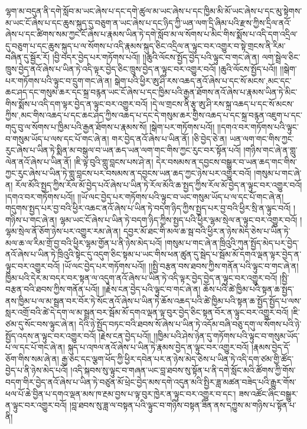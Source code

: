 ལྷག་མ་བདུན་ནི་དགེ་སློབ་མ་ཡང་ཞེས་པ་དང་དགེ་ཚུལ་མ་ཡང་ཞེས་པ་དང་ཁྱིམ་མི་མོ་ཡང་ཞེས་པ་དང་མུ་སྟེགས་མ་ཡང་ངོ་ཞེས་པ་དང་ཆུས་སྐུད་དུ་བཅུག་ན་ཡང་ཞེས་པ་དང་ཉིད་ཀྱི་ཡན་ལག་དྲི་ཞིམ་པའི་རྫས་ཀྱིས་དྲིལ་ནའོ་ཞེས་པ་དང་ཚིགས་སམ་ཀྱང་ངོ་ཞེས་པ་རྣམས་ཡིན་ཏེ་དགེ་སློབ་མ་ལ་སོགས་པ་མིང་གིས་སྨོས་པ་འདི་དག་འདྲིལ་དུ་བཅུག་པ་དང་ཆུས་སྐུད་པ་ལ་སོགས་པ་འདི་རྣམས་སྐུད་ཅིང་འདྲིལ་ན་ལྟུང་བར་འགྱུར་བ་སྟེ་གྲངས་ནི་རིམ་བཞིན་དུ་སྦྱོར་རོ། །བྱི་བདར་བྱེད་པར་གཏོགས་པའོ།། །།ཆུའི་ལོངས་སྤྱོད་བྱེད་པའི་ལྟུང་བ་གང་ཞེ་ན། ལག་སྦྲེལ་ཅིང་ཁྲུས་བྱེད་ནའོ་ཞེས་པ་ཡིན་ཏེ་འདི་ལྟར་བྱེད་ཅིང་ཁྲུས་བྱེད་ན་ལྟུང་བར་འགྱུར་བའོ། །ཆུའི་ལོངས་སྤྱོད་པའོ།། །།སྒེག་པར་གཏོགས་པའི་ལྟུང་བ་དྲུག་གང་ཞེ་ན། སྒེག་པའི་ཕྱིར་ཨུ་ཤི་རས་འཆད་ནའོ་ཞེས་པ་དང་སོ་{མངས་,མང་}དང་ཆང་ཤད་དང་གསུམ་ཆར་དང་སྐྲ་བརྙན་ཡང་ངོ་ཞེས་པ་དང་ཁྱིམ་པའི་རྒྱན་ཐོགས་ནའོ་ཞེས་པ་རྣམས་ཡིན་ཏེ་མིང་གིས་སྨོས་པ་འདི་དག་ལྟར་བྱེད་ན་ལྟུང་བར་འགྱུར་བའོ། །དེ་ལ་གྲངས་ནི་རྩྭ་ཨུ་ཤི་རས་སྐྲ་འཆད་པ་དང་སོ་{མངས་ཀྱིས་,མང་གིས་}འཆད་པ་དང་ཆང་ཤད་ཀྱིས་འཆད་པ་དང་དེ་གསུམ་ཆར་གྱིས་འཆད་པ་དང་སྐྲ་བརྙན་འཇུག་པ་དང་གདུ་བུ་ལ་སོགས་པ་ཁྱིམ་པའི་རྒྱན་ཐོགས་པ་རྣམས་སོ། །སྒེག་པར་གཏོགས་པའོ།། །།དགའ་བར་གཏོགས་པའི་ལྟུང་བ་གསུམ་ཡོད་པ་ལས་དང་པོ་གང་ཞེ་ན། གར་བྱེད་ནའོ་ཞེས་པ་ཡིན་ནོ། །ཅི་བྱེད་ཅེ་ན། ཡན་ལག་གང་གིས་ཀྱང་རུང་ཞེས་པ་ཡིན་ཏེ་སྨིན་མ་བསྒུལ་བ་ཡན་ཆད་ཡན་ལག་གང་གིས་ཀྱང་རུང་བར་སྟོན་པའོ། །གཉིས་གང་ཞེ་ན་གླུ་ལེན་ནའོ་ཞེས་པ་ཡིན་ནོ། །ཇི་ལྟ་བུའི་གླུ་བླངས་པས་ཤེ་ན། དེར་བསམས་ན་དབྱངས་བསྒྱུར་བ་ཡན་ཆད་གང་གིས་ཀྱང་རུང་ཞེས་པ་ཡིན་ཏེ་གླུ་བླངས་པར་བསམས་ན་དབྱངས་ཡན་ཆད་ཀྱང་ཉེས་པར་འགྱུར་བའོ། །གསུམ་པ་གང་ཞེ་ན། རོལ་མོའི་སྤྱད་ཀྱིས་རོལ་མོ་བྱེད་པའོ་ཞེས་པ་ཡིན་ཏེ་རོལ་མོའི་ཆ་སྤྱད་ཀྱིས་རོལ་མོ་བྱེད་ན་ལྟུང་བར་འགྱུར་བའོ། །དགའ་བར་གཏོགས་པའོ།། །།ཡོ་ལང་བྱེད་པར་གཏོགས་པའི་ལྟུང་བ་ཡང་གསུམ་ཡོད་པ་ལ་དང་པོ་གང་ཞེ་ན། གདུགས་སྤྱད་པར་བྱ་བའི་ཕྱིར་འཆང་ནའོ་ཞེས་པ་ཡིན་ཏེ་བདག་ཉིད་ཀྱིས་སྤྱད་པར་བྱ་བའི་ཕྱིར་སྲི་ན་ལྟུང་བའོ། །གཉིས་པ་གང་ཞེ་ན། ལྷམ་ཡང་ངོ་ཞེས་པ་ཡིན་ཏེ་བདག་ཉིད་ཀྱིས་སྤྱད་པའི་ཕྱིར་ལྷམ་སྲེལ་ན་ལྟུང་བར་འགྱུར་བའོ། །ལྷམ་སྲེལ་ནོ་ཅོག་ཉེས་པར་འགྱུར་རམ་ཞེ་ན། དབྱར་མོ་ཐང་གི་མལ་ཆ་སྦ་བའི་ཕྱིར་ན་ཉེས་མེད་ཅེས་པ་ཡིན་ཏེ་མལ་ཆ་ལ་རིམ་གྲོ་བྱ་བའི་ཕྱིར་ལྷམ་གྱོན་པ་ནི་ཉེས་མེད་པའོ། །གསུམ་པ་གང་ཞེ་ན་ཁྲིའུའི་ཀུན་སྤྱོད་མེད་པར་བྱེད་ནའོ་ཞེས་པ་ཡིན་ཏེ་ཁྲིའུའི་སྟེང་དུ་འདུག་ཅིང་སྟམ་པ་ཡང་གིས་ཕན་ཚུན་དུ་སྦེད་པ་སྦོམ་མོ་དགའ་ལྡན་ལྟར་བྱེད་ན་ལྟུང་བར་འགྱུར་བའོ། །ཡོ་ལང་བྱེད་པར་གཏོགས་པའོ།། །།སྤྱི་བརྩན་བས་ཐབས་ཀྱིས་གནོན་པའི་ལྟུང་བ་གང་ཞེ་ན། ཁྱིམ་པའི་དེར་མ་བདར་བར་སྟན་ལ་འདུག་ནའོ་ཞེས་པ་ཡིན་ཏེ་འདི་ལྟར་བྱེད་བྱེད་ན་ལྟུང་བར་འགྱུར་བའོ། །སྤྱི་བརྩན་བའི་ཐབས་ཀྱིས་གནོན་པའོ།། །།རྗེས་ངན་བྱེད་པའི་ལྟུང་བ་གང་ཞེ་ན། ཆོས་པའི་ཚེ་ཁྱིམ་པའི་སྟན་ཆ་སྤྱད་ནས་ཁྱིམ་པ་ལ་མ་སྦྲན་བར་བོར་ཏེ་སོང་ནའོ་ཞེས་པ་ཡིན་ཏེ་ཆོས་འཆད་པའི་ཚེ་ཁྱིམ་པའི་སྟན་ཆ་སྤྱོད་སྤྱོད་པ་ལས་སླར་འགྲོ་བའི་ཚེ་དེ་དག་ལ་མ་སྦྲན་བར་སྦོམ་མོ་དགའ་ལྡན་ལྟ་བུར་བྱེད་ཅིང་སྟན་བོར་ན་ལྟུང་བར་འགྱུར་བའོ། །ཇི་ཙམ་དུ་སོང་བས་ལྟུང་ཞེ་ན། དེའི་ཉེ་སྤྱོད་བཏང་བའི་ཐབས་སོ་ཞེས་པ་ཡིན་ཏེ་འདོམ་བཞི་བཅུ་དགུ་ལ་སོགས་པའི་ཉེ་སྤྱོད་འདས་ན་ལྟུང་བར་འགྱུར་བའོ། །རྗེས་ངན་བྱེད་པའོ།། །།ཁྱིམ་པའི་ཤེས་ཉེན་དུ་གཏོགས་པའི་ལྟུང་བ་གསུམ་ཡོད་པ་ལ་དང་པོ་གང་ཞེ་ན། སྐུད་པ་འཁལ་ནའོ་ཞེས་པ་ཡིན་ཏེ་རྣམས་བྱེད་ན་ལྟུང་བར་འགྱུར་བའོ། །རྣམས་བྱེད་དོ་ཅོག་གིས་སམ་ཞེ་ན། རྒྱ་ཅང་དང་ལྕག་ཕོད་ཀྱི་ཕྱིར་དབེན་པར་ན་ཉེས་མེད་ཅེས་པ་ཡིན་ཏེ་འདི་དག་ཙམ་གྱི་ཚོད་བྱེད་པ་ནི་ཉེས་མེད་པའོ། །འདི་སྐབས་སུ་ལྟུང་བ་གཞན་ཡང་བླ་ཐབས་སུ་སྟོན་པ་ནི་དགེ་སློང་མའི་ཚོགས་ཀྱི་གོས་བདག་གིར་བྱེད་ནའོ་ཞེས་པ་ཡིན་ཏེ་བཙུན་མོ་ཕྲེང་བྱེད་མས་དགེ་འདུན་མའི་སྤྱིར་ཟླ་མཚན་བཟེད་པའི་རྒྱུར་གོས་ཕལ་པོ་ཆེ་བྱིན་པ་དགའ་ལྡན་མས་ཁ་རྔམ་བྱས་པ་ལྟ་བུར་ཁྱེར་ན་ལྟུང་བར་འགྱུར་བ་དང་། ཟས་འཚོང་ཞིང་བསྒྱུར་ན་ལྟུང་བར་འགྱུར་བའོ། །བླ་ཐབས་སུ་ཟླ་ལ་བསྟན་པའི་ལྟུང་བ་གཉིས་བསྟན་ཟིན་ནས་དཀྱུས་མ་གཉིས་པ་སྟོན་པ་ནི། 